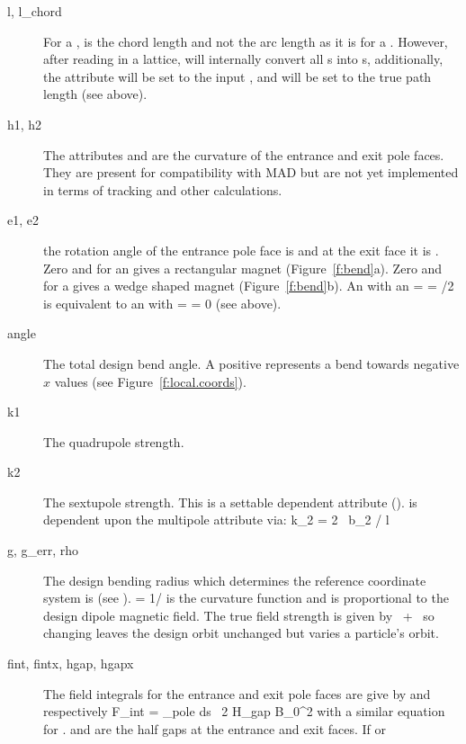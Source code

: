   \begin{description}
  \item[l, l_chord]  
For a ,  is the chord length and not the arc length as
it is for a .  However, after reading in a lattice, \bmad will
internally convert all s into s, additionally, the
 attribute will be set to the input , and  
will be set to the true path length (see above).
  \item[h1, h2]
The attributes  and  are the curvature of the entrance
and exit pole faces. They are present for compatibility with MAD but
are not yet implemented in terms of tracking and other calculations.
  \item[e1, e2]
the rotation angle of the entrance pole face is  and at the
exit face it is . Zero  and  for an 
gives a rectangular magnet  (Figure~\ref{f:bend}a). Zero  and 
for a  gives a wedge shaped magnet (Figure~\ref{f:bend}b).
An  with an  =  =
/2 is equivalent to an  with  =  =
0 (see above).
  \item[angle]
The total design bend angle. A positive  represents a
bend towards negative $x$ values (see Figure~\ref{f:local.coords}).
  \item[k1]
The quadrupole strength.
  \item[k2]
The sextupole strength. This is a settable dependent attribute (). 
 is dependent upon the  multipole attribute via:
\Begineq
  k_2 = 2 \, b_2 / l
\Endeq 
  \item[g, g_err, rho]
The design bending radius which determines the reference coordinate
system is  (see ).   = 1/ is
the curvature function and is proportional to the design dipole
magnetic field. The true field strength is given by
~+~ so changing  leaves the design orbit
unchanged but varies a particle's orbit.
  \item[fint, fintx, hgap, hgapx]
The field integrals for the entrance and
exit pole faces are give by  and  respectively
\Begineq
  F_{int} = \int_{pole} \! \! ds \, 
  {2 H_{gap} B_0^2}
\Endeq
{}
with a similar equation for .  and  are
the half gaps at the entrance and exit faces. If  or

\end{description}
